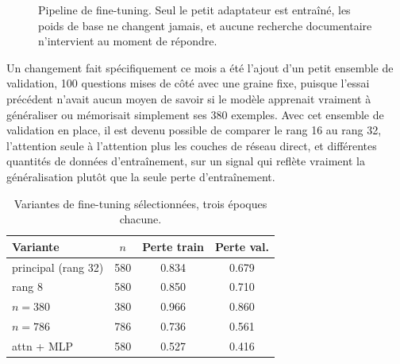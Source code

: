 \documentclass[11pt, a4paper]{article}
\begin{document}
\begin{figure}[H]
\centering
{}
\caption{Pipeline de fine-tuning. Seul le petit adaptateur est entra\^in\'e, les poids de base ne changent jamais, et aucune recherche documentaire n'intervient au moment de r\'epondre.}
\label{fig:ftdiagram}
\end{figure}

Un changement fait sp\'ecifiquement ce mois a \'et\'e l'ajout d'un petit ensemble de validation, 100 questions mises de c\^ot\'e avec une graine fixe, puisque l'essai pr\'ec\'edent n'avait aucun moyen de savoir si le mod\`ele apprenait vraiment \`a g\'en\'eraliser ou m\'emorisait simplement ses 380 exemples. Avec cet ensemble de validation en place, il est devenu possible de comparer le rang 16 au rang 32, l'attention seule \`a l'attention plus les couches de r\'eseau direct, et diff\'erentes quantit\'es de donn\'ees d'entra\^inement, sur un signal qui refl\`ete vraiment la g\'en\'eralisation plut\^ot que la seule perte d'entra\^inement.

\begin{table}[H]
\centering
\small
\begin{tabular}{lccc}
\toprule
\textbf{Variante} & \textbf{$n$} & \textbf{Perte train} & \textbf{Perte val.} \\
\midrule
principal (rang 32) & 580 & 0.834 & 0.679 \\
rang 8 & 580 & 0.850 & 0.710 \\
$n=380$ & 380 & 0.966 & 0.860 \\
$n=786$ & 786 & 0.736 & 0.561 \\
attn + MLP & 580 & 0.527 & 0.416 \\
\bottomrule
\end{tabular}
\caption{Variantes de fine-tuning s\'electionn\'ees, trois \'epoques chacune.}
\label{tab:finetune}
\end{table}
\end{document}

